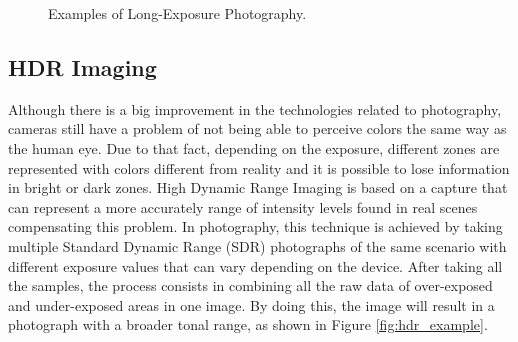 \begin{figure}[htbp]
        \centering
  \caption{Examples of Long-Exposure Photography. \cite{Kamps2012}}
  \label{fig:long_exposure_example}
\end{figure}

\subsection{HDR Imaging}

Although there is a big improvement in the technologies related to photography, cameras still have a problem of not being able to perceive colors the same way as the human eye. Due to that fact, depending on the exposure, different zones are represented with colors different from reality and it is possible to lose information in bright or dark zones. High Dynamic Range Imaging is based on a capture that can represent a more accurately range of intensity levels found in real scenes compensating this problem.
In photography, this technique is achieved by taking multiple Standard Dynamic Range (SDR) photographs of the same scenario with different exposure values that can vary depending on the device. After taking all the samples, the process consists in combining all the raw data of over-exposed and under-exposed areas in one image. By doing this, the image will result in a photograph with a broader tonal range, as shown in Figure \ref{fig:hdr_example}.

